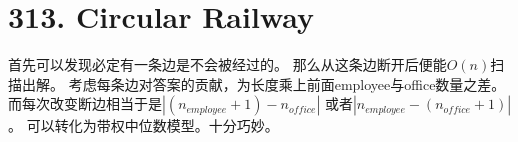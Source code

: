 \section{313. Circular Railway}
首先可以发现必定有一条边是不会被经过的。
那么从这条边断开后便能$O(n)$扫描出解。
考虑每条边对答案的贡献，为长度乘上前面employee与office数量之差。
而每次改变断边相当于是$|(n_{employee} + 1) - n_{office}|$
或者$|n_{employee} - (n_{office}+1)|$。
可以转化为带权中位数模型。十分巧妙。
